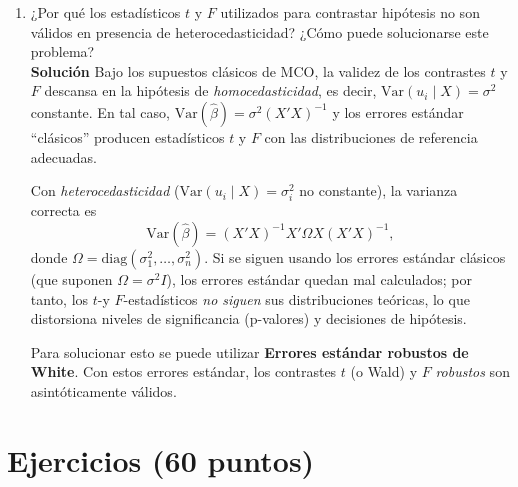 \documentclass[10pt,a4paper]{article}
\begin{document}
\begin{enumerate}
\textbf{(b) Efecto de incluir una variable instrumental.}
Si existe endogeneidad (\(\mathrm{Cov}(X,u)\neq0\)), el estimador MCO es sesgado e inconsistente. Al usar VI/MC2E se identifica el efecto causal utilizando solo la parte \emph{exógena} de \(X\) inducida por \(Z\), obteniendo un estimador \(\hat\beta_{IV}\) consistente. 
En modelos simples, \(\hat\beta_{IV} = \dfrac{\mathrm{Cov}(Y,Z)}{\mathrm{Cov}(X,Z)}\). 
Comparativamente, cuando la omisión de habilidad provoca que MCO sobreestime el retorno a la educación, suele observarse \(\hat\beta_{MCO}>\hat\beta_{IV}\); si el problema fuera error de medición en \(X\), entonces \(\hat\beta_{MCO}<\hat\beta_{IV}\). 
Eso sí, la varianza de \(\hat\beta_{IV}\) tiende a ser mayor que la de MCO y aumenta si el instrumento es débil (bajo \(R^2\) en la primera etapa). 

\item ¿Por qué los estadísticos \(t\) y \(F\) utilizados para contrastar hipótesis no son válidos en presencia de heterocedasticidad?
¿Cómo puede solucionarse este problema?
\\
\textbf{Solución}
Bajo los supuestos clásicos de MCO, la validez de los contrastes \(t\) y \(F\) descansa en la hipótesis de
\emph{homocedasticidad}, es decir, \(\mathrm{Var}(u_i \mid X)=\sigma^2\) constante. En tal caso,
\(\mathrm{Var}(\hat\beta)=\sigma^2 (X'X)^{-1}\) y los errores estándar ``clásicos'' producen
estadísticos \(t\) y \(F\) con las distribuciones de referencia adecuadas.

Con \emph{heterocedasticidad} (\(\mathrm{Var}(u_i \mid X)=\sigma_i^2\) no constante),
la varianza correcta es
\[
\mathrm{Var}(\hat\beta)=(X'X)^{-1} X' \Omega X (X'X)^{-1},
\]
donde \(\Omega=\mathrm{diag}(\sigma_1^2,\dots,\sigma_n^2)\).
Si se siguen usando los errores estándar clásicos (que suponen \(\Omega=\sigma^2 I\)),
los errores estándar quedan mal calculados; por tanto, los \(t\)-y \(F\)-estadísticos
\emph{no siguen} sus distribuciones teóricas, lo que distorsiona niveles de significancia
(p-valores) y decisiones de hipótesis.

\medskip
   Para solucionar esto se puede utilizar \textbf{Errores estándar robustos de White}.
  Con estos errores estándar, los contrastes \(t\) (o Wald) y \(F\) \emph{robustos}
  son asintóticamente válidos.
\end{enumerate}



\section{Ejercicios (60 puntos)}
\end{document}
